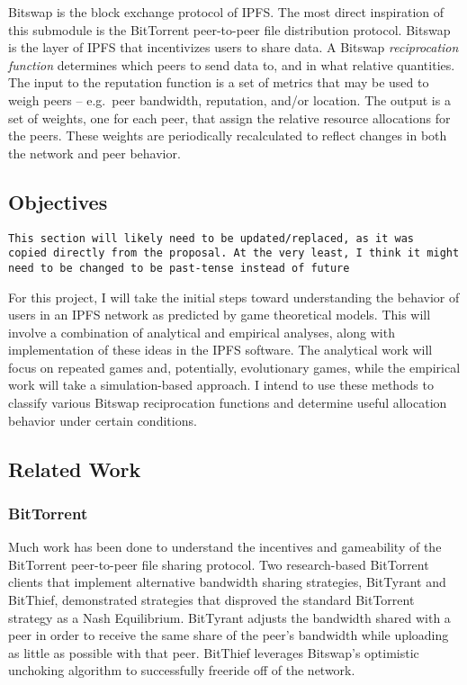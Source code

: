 Bitswap is the block exchange protocol of IPFS. The most direct
inspiration of this submodule is the BitTorrent peer-to-peer file
distribution protocol. Bitswap is the layer of IPFS that incentivizes
users to share data. A Bitswap \emph{reciprocation function} determines
which peers to send data to, and in what relative quantities. The input
to the reputation function is a set of metrics that may be used to weigh
peers -- e.g.~peer bandwidth, reputation, and/or location. The output is
a set of weights, one for each peer, that assign the relative resource
allocations for the peers. These weights are periodically recalculated
to reflect changes in both the network and peer behavior.

\hypertarget{objectives}{%
\subsection{Objectives}\label{objectives}}

\texttt{This\ section\ will\ likely\ need\ to\ be\ updated/replaced,\ as\ it\ was
copied\ directly\ from\ the\ proposal.\ At\ the\ very\ least,\ I\ think\ it\ might
need\ to\ be\ changed\ to\ be\ past-tense\ instead\ of\ future}

For this project, I will take the initial steps toward understanding the
behavior of users in an IPFS network as predicted by game theoretical
models. This will involve a combination of analytical and empirical
analyses, along with implementation of these ideas in the IPFS software.
The analytical work will focus on repeated games and, potentially,
evolutionary games, while the empirical work will take a
simulation-based approach. I intend to use these methods to classify
various Bitswap reciprocation functions and determine useful allocation
behavior under certain conditions.

\hypertarget{related-work}{%
\subsection{Related Work}\label{related-work}}

\hypertarget{bittorrent}{%
\subsubsection{BitTorrent}\label{bittorrent}}

Much work has been done to understand the incentives and gameability of
the BitTorrent peer-to-peer file sharing protocol. Two research-based
BitTorrent clients that implement alternative bandwidth sharing strategies,
BitTyrant and BitThief, demonstrated strategies that disproved the standard
BitTorrent strategy as a Nash Equilibrium. BitTyrant adjusts the bandwidth
shared with a peer in order to receive the same share of the peer's bandwidth
while uploading as little as possible with that peer. BitThief leverages
Bitswap's optimistic unchoking algorithm to successfully freeride off of the
network.

